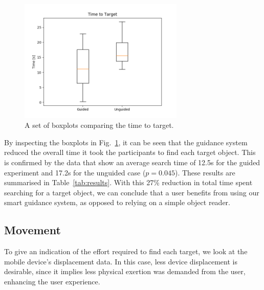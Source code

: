 \documentclass[runningheads]{llncs}
\newcommand\todo[1]{\textcolor{red}{#1}}
\begin{document}
\begin{figure}
  \centering
  \includegraphics[width=0.7\textwidth]{figures/boxplot_time_to_target.png}
  \caption{A set of boxplots comparing the time to target. }\label{fig:boxplot-time}
\end{figure}


By inspecting the boxplots in Fig.~\ref{fig:boxplot-time}, it can be seen that the guidance system reduced the overall time it took the participants to find each target object.
This is confirmed by the data that show an average search time of 12.5s for the guided experiment and 17.2s for the unguided case ($p=0.045$).
These results are summarised in Table~\ref{tab:results}. 
With this 27\% reduction in total time spent searching for a target object, we can conclude that a user benefits from using our smart guidance system, as opposed to relying on a simple object reader. 

\subsection{Movement}

To give an indication of the effort required to find each target, we look at the mobile device's displacement data. 
In this case, less device displacement is desirable, since it implies less physical exertion was demanded from the user, enhancing the user experience.
\end{document}

